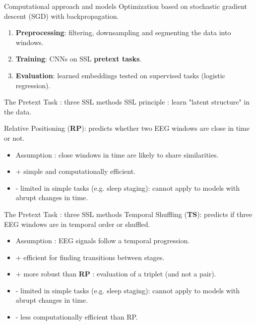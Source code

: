 \begin{frame}{Computational approach and models}
Optimization based on stochastic gradient descent (SGD) with backpropagation.
    \begin{enumerate}
        \item \textbf{Preprocessing}: filtering, downsampling and segmenting the data into windows.
        \item \textbf{Training}: CNNs on SSL \textbf{pretext tasks}.
        \item \textbf{Evaluation}: learned embeddings tested on supervised tasks (logistic regression).
    \end{enumerate}

\begin{frame}{The Pretext Task : three SSL methods}
SSL principle : learn "latent structure" in the data.

Relative Positioning (\textbf{RP}): predicts whether two EEG windows are close in time or not.
\begin{itemize}
    \item Assumption : close windows in time are likely to share similarities.
    \item + simple and computationally efficient.
    \item - limited in simple tasks (e.g. sleep staging): cannot apply to models with abrupt changes in time.
\end{itemize}
\end{frame}

\begin{frame}{The Pretext Task : three SSL methods}
Temporal Shuffling (\textbf{TS}): predicts if three EEG windows are in temporal order or shuffled.
\begin{itemize}
    \item Assumption : EEG signals follow a temporal progression.
    \item + efficient for finding transitions between stages.
    \item + more robust than \textbf{RP} : evaluation of a triplet (and not a pair).
    \item - limited in simple tasks (e.g. sleep staging): cannot apply to models with abrupt changes in time.
    \item - less computationally efficient than RP.
\end{itemize}
\end{frame}


\end{frame}
